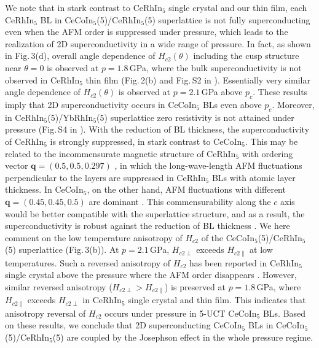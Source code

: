\documentclass[twocolumn,preprintnumbers,amsmath,amssymb,prl]{revtex4}
\begin{document}
We note that  in stark contrast to CeRhIn$_5$ single crystal and our thin film, each CeRhIn$_5$ BL in CeCoIn$_5$(5)/CeRhIn$_5$(5) superlattice is not fully superconducting even when the AFM order is suppressed under pressure, which leads to the realization of 2D superconductivity in a wide range of pressure.  In fact, as shown in Fig.\,3(d), overall angle dependence of $H_{c2}(\theta)$ including the cusp structure near $\theta=0$ is observed at $p=1.8$\,GPa, where the bulk superconductivity is not observed in CeRhIn$_5$ thin film (Fig.\,2(b) and Fig.\,S2 in \cite{SM}).  Essentially very similar angle dependence of $H_{c2}(\theta)$ is observed at $p=2.1$\,GPa above $p_c$.  These results imply that 2D superconductivity occurs in CeCoIn$_5$ BLs even above $p_c$.   Moreover,  in CeRhIn$_5$(5)/YbRhIn$_5$(5) 
superlattice zero resistivity is not attained under pressure (Fig.\,S4 in \cite{SM}).   
With the reduction of BL thickness, the superconductivity of CeRhIn$_5$ is strongly suppressed, in stark contrast to CeCoIn$_5$. This may be related to the incommensurate magnetic structure of CeRhIn$_5$ with ordering vector $\bm{q}=(0.5,0.5, 0.297)$ \cite{Bao}, in which the long-wave-length AFM fluctuations perpendicular to the layers are suppressed in CeRhIn$_5$ BLs with atomic layer thickness.  In CeCoIn$_5$, on the other hand, AFM fluctuations with different $\bm{q}=(0.45, 0.45, 0.5)$ are dominant \cite{Raymond}. This commensurability along the $c$ axis would be better compatible with the superlattice structure, and as a result,   the superconductivity is robust against the reduction of BL thickness \cite{Yamanaka}. 
We here comment on the low temperature anisotropy of $H_{c2}$ of the CeCoIn$_5$(5)/CeRhIn$_5$(5) superlattice  (Fig.\,3(b)).  At $p=2.1$\,GPa, $H_{c2\perp}$ exceeds $H_{c2\parallel}$ at low temperatures. Such a  reversed  anisotropy of $H_{c2}$ has been reported in CeRhIn$_5$ single crystal above the pressure where the AFM order disappears \cite{Thompson,Park2008}.  However, similar reversed anisotropy ($H_{c2\perp}>H_{c2\parallel}$) is preserved at $p=1.8$\,GPa, where $H_{c2\parallel}$ exceeds $H_{c2\perp}$ in CeRhIn$_5$ single crystal and thin film. This indicates that anisotropy reversal of $H_{c2}$ occurs under pressure in  5-UCT CeCoIn$_5$ BLs.  Based on these results, we conclude that  2D superconducting CeCoIn$_5$ BLs in CeCoIn$_5$(5)/CeRhIn$_5$(5) are coupled by the Josephson effect in the whole pressure regime.
\end{document}
